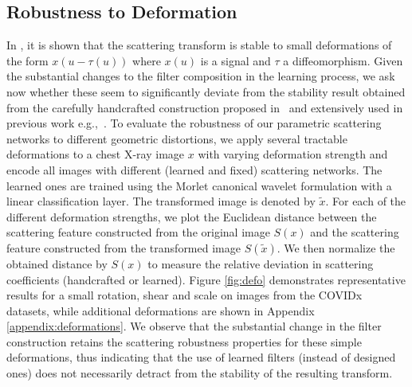 \documentclass[10pt,twocolumn,letterpaper]{article}
\begin{document}
\subsection{Robustness to Deformation}
\label{section:deformation}
In \cite{mallat2012group}, it is shown that the scattering transform is stable to small deformations of the form $x(u-\tau(u))$ where $x(u)$ is a signal and $\tau$ a diffeomorphism. Given the substantial changes to the filter composition in the learning process, we ask now whether these seem to significantly deviate from the stability result obtained from the carefully handcrafted construction proposed in~\cite{mallat2012group} and extensively used in previous work e.g.,~\cite{bruna2013invariant,eickenberg2018solid}. To evaluate the robustness of our parametric scattering networks to different geometric distortions, we apply several tractable deformations to a chest X-ray image $x$ with varying deformation strength and encode all images with different (learned and fixed) scattering networks. The learned ones are trained using the Morlet canonical wavelet formulation with a linear classification layer. The transformed image is denoted by $\tilde{x}$. For each of the different deformation strengths, we plot the Euclidean distance between the scattering feature constructed from the original image $S(x)$ and the scattering feature constructed from the transformed image $S(\tilde{x})$. We then normalize the obtained distance by $S(x)$ to measure the relative deviation in scattering coefficients (handcrafted or learned). Figure \ref{fig:defo} demonstrates representative results for a small rotation, shear and scale on images from the COVIDx datasets, while additional deformations are shown in Appendix \ref{appendix:deformations}. We observe that the substantial change in the filter construction retains the scattering robustness properties for these simple deformations, thus indicating that the use of learned filters (instead of designed ones) does not necessarily detract from the stability of the resulting transform.
\end{document}
